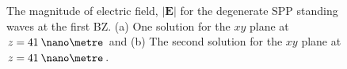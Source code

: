 \begin{figure}
	\begin{center}
	\end{center}	
\caption[The magnitude of electric field, $|\mathbf{E}|$ for the degenerate SPP standing waves at the first BZ. ($xy$ plane)]{The magnitude of electric field, $|\mathbf{E}|$ for the degenerate SPP standing waves at the first BZ. (a) One solution for the $xy$ plane at $z=41\:\nano\metre$ and (b) The second solution for the $xy$ plane at $z=41\:\nano\metre$. \label{fig:zzbandgapfields2}}
\end{figure}

